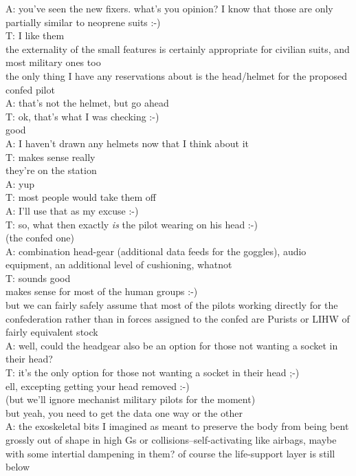 A: you've seen the new fixers. what's you opinion? I know that those are only partially similar to neoprene suits :-)\\
T: I like them\\
the externality of the small features is certainly appropriate for civilian suits, and most military ones too\\
the only thing I have any reservations about is the head/helmet for the proposed confed pilot\\
A: that's not the helmet, but go ahead\\
T: ok, that's what I was checking :-)\\
good\\
A: I haven't drawn any helmets now that I think about it\\
T: makes sense really\\
they're on the station\\
A: yup\\
T: most people would take them off\\
A: I'll use that as my excuse :-)\\
T: so, what then exactly {\em is} the pilot wearing on his head :-)\\
(the confed one)\\
A: combination head-gear (additional data feeds for the goggles), audio equipment, an additional level of cushioning, whatnot\\
T: sounds good\\
makes sense for most of the human groups :-)\\
but we can fairly safely assume that most of the pilots working directly for the confederation rather than in forces assigned to the confed are Purists or LIHW of fairly equivalent stock\\
A: well, could the headgear also be an option for those not wanting a socket in their head?\\
T: it's the only option for those not wanting a socket in their head ;-)\\
ell, excepting getting your head removed :-)\\
(but we'll ignore mechanist military pilots for the moment)\\
but yeah, you need to get the data one way or the other\\
A: the exoskeletal bits I imagined as meant to preserve the body from being bent grossly out of shape in high Gs or collisions--self-activating like airbags, maybe with some intertial dampening in them? of course the life-support layer is still below\\
